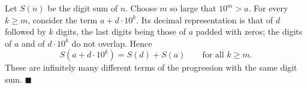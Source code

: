 Let $S(n)$ be the digit sum of $n$. Choose $m$ so large that $10^m>a$. For every $k\ge m$, consider the term $a+d\cdot10^k$. Its decimal representation is that of $d$ followed by $k$ digits, the last digits being those of $a$ padded with zeros; the digits of $a$ and of $d\cdot10^k$ do not overlap. Hence
\[
S\!\left(a+d\cdot10^k\right)=S(d)+S(a)\qquad\text{for all }k\ge m .
\]
These are infinitely many different terms of the progression with the same digit sum. $\blacksquare$
